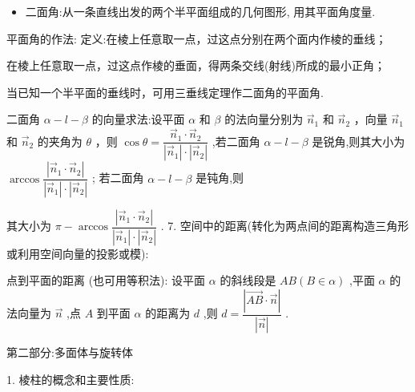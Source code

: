 \begin{itemize}\relax
\item\relax 二面角:从一条直线出发的两个半平面组成的几何图形, 用其平面角度量.
\end{itemize}

平面角的作法:  定义:在棱上任意取一点，过这点分别在两个面内作棱的垂线；

  在棱上任意取一点，过这点作棱的垂面，得两条交线(射线)所成的最小正角；

   当已知一个半平面的垂线时，可用三垂线定理作二面角的平面角.

  二面角 $\alpha  - l - \beta$ 的向量求法:设平面 $\alpha$ 和 $\beta$ 的法向量分别为 ${\overrightarrow{n}}_{1}$ 和 ${\overrightarrow{n}}_{2}$ ，向量 ${\overrightarrow{n}}_{1}$ 和 ${\overrightarrow{n}}_{2}$ 的夹角为 $\theta$ ，则 $\cos \theta  = \dfrac{{\overrightarrow{n}}_{1} \cdot  {\overrightarrow{n}}_{2}}{\left| {\overrightarrow{n}}_{1}\right|  \cdot  \left| {\overrightarrow{n}}_{2}\right| }$ ,若二面角 $\alpha  - l - \beta$ 是锐角,则其大小为 $\arccos \dfrac{\left| {\overrightarrow{n}}_{1} \cdot  {\overrightarrow{n}}_{2}\right| }{\left| {\overrightarrow{n}}_{1}\right|  \cdot  \left| {\overrightarrow{n}}_{2}\right| }$ ; 若二面角 $\alpha  - l - \beta$ 是钝角,则

其大小为 $\pi  - \arccos \dfrac{\left| {\overrightarrow{n}}_{1} \cdot  {\overrightarrow{n}}_{2}\right| }{\left| {\overrightarrow{n}}_{1}\right|  \cdot  \left| {\overrightarrow{n}}_{2}\right| }$ . 7. 空间中的距离(转化为两点间的距离构造三角形或利用空间向量的投影或模):

  点到平面的距离 (也可用等积法): 设平面 $\alpha$ 的斜线段是 ${AB}\left( {B \in  \alpha }\right)$ ,平面 $\alpha$ 的法向量为 $\overrightarrow{n}$ ,点 $A$ 到平面 $\alpha$ 的距离为 $d$ ,则 $d = \dfrac{\left| \overrightarrow{AB} \cdot  \overrightarrow{n}\right| }{\left| \overrightarrow{n}\right| }$ .

第二部分:多面体与旋转体

1. 棱柱的概念和主要性质:

